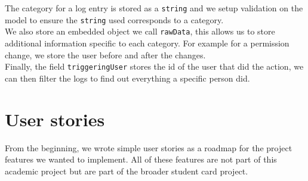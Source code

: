 \documentclass[twoside, openright,11pt,a4paper]{book}
\begin{document}
The category for a log entry is stored as a \verb+string+ and we setup validation on the model to ensure the \verb+string+ used corresponds to a category.\\

We also store an embedded object we call \verb+rawData+, this allows us to store additional information specific to each category. For example for a permission change, we store the user before and after the changes. \\

Finally, the field \verb+triggeringUser+ stores the id of the user that did the action, we can then filter the logs to find out everything a specific person did.
\section{User stories}
From the beginning, we wrote simple user stories as a roadmap for the project features we wanted to implement. All of these features are not part of this academic project but are part of the broader student card project. 
\end{document}
